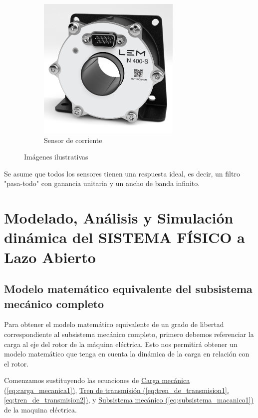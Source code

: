 \documentclass{article}
\begin{document}
\begin{figure}[ht]
\begin{subfigure}[b]{0.3\textwidth}
      \centering
      \includegraphics[width=0.75\textwidth]{Alan4.jpg}
      \caption{Sensor de corriente}
    \end{subfigure}
    \caption{Imágenes ilustrativas}
  \end{figure}


Se asume que todos los sensores tienen una respuesta ideal, es decir, un filtro "pasa-todo" con ganancia 
unitaria y un ancho de banda infinito.

\newpage


\section{Modelado, Análisis y Simulación dinámica del SISTEMA FÍSICO a Lazo Abierto}


\subsection{Modelo matemático equivalente del subsistema mecánico completo}

Para obtener el modelo matemático equivalente de un grado de libertad correspondiente al subsistema 
mecánico completo, primero debemos referenciar la carga al eje del rotor de la máquina eléctrica. Esto 
nos permitirá obtener un modelo matemático que tenga en cuenta la dinámica de la carga en relación con 
el rotor.

Comenzamos sustituyendo las ecuaciones de
\hyperref[eq:carga_mecanica1]{Carga mecánica (\ref*{eq:carga_mecanica1})}, 
\hyperref[eq:tren_de_transmision1, eq:tren_de_transmision2]{Tren de transmisión (\ref*{eq:tren_de_transmision1}, \ref*{eq:tren_de_transmision2})}, y
\hyperref[eq:subsistema_macanico1]{Subsistema mecánico (\ref*{eq:subsistema_macanico1})} de la maquina eléctrica.
\end{document}
